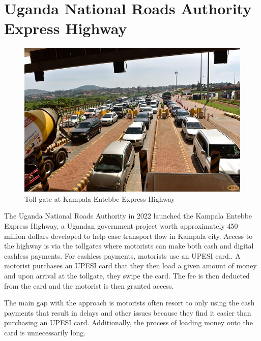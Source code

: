 \clearpage

\section{Uganda National Roads Authority Express Highway}
\begin{figure}[h]
    \begin{center}
        \includegraphics[scale = 0.3]{images/ebbs}
        \caption{Toll gate at Kampala Entebbe Express Highway}
    \end{center}
\end{figure}
The Uganda National Roads Authority in 2022 launched the Kampala Entebbe Express Highway, a Ugandan government project worth approximately 450 million dollars developed to help ease transport flow in Kampala city. Access to the highway is via the tollgates where motorists can make both cash and digital cashless payments. For cashless payments, motorists use an UPESI card.\cite{unra_news_2022}. A motorist purchases an UPESI card that they then load a given amount of money and upon arrival at the tollgate, they swipe the card. The fee is then deducted from the card and the motorist is then granted access.

The main gap with the approach is motorists often resort to only using the cash payments that result in delays and other issues because they find it easier than purchasing an UPESI card. Additionally, the process of loading money onto the card is unnecessarily long.

\clearpage

